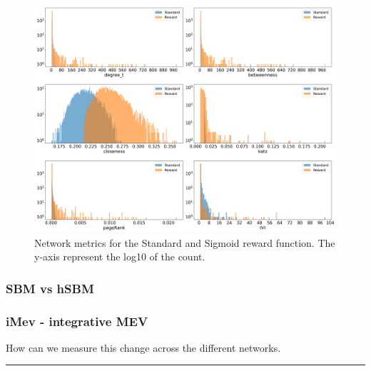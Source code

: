 \begin{figure}[H]    
    \centering
    \includegraphics[width=1.0\textwidth,height=1.0\textheight,keepaspectratio]{Sections/Network_II/validation/net_metrics_Standard_Reward.png}
    \caption{Network metrics for the Standard and Sigmoid reward function. The y-axis represent the log10 of the count. }
    \label{fig:N_II:net_metric_sig_std}
\end{figure}





\subsubsection{SBM vs hSBM}



\subsubsection{iMev - integrative MEV}



How can we measure this change across the different networks.

\par\noindent\rule{\textwidth}{0.4pt}


